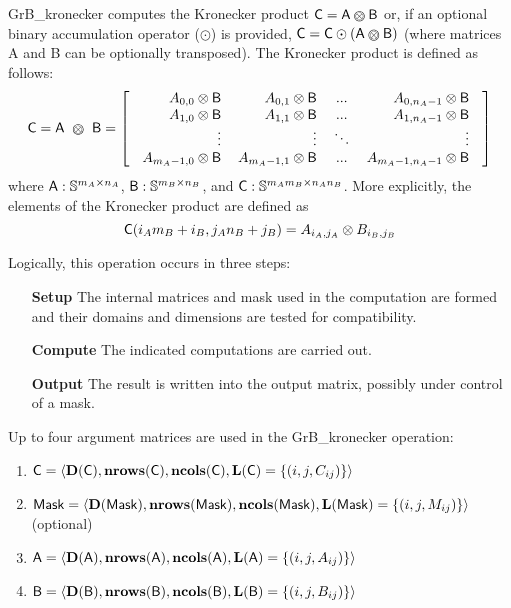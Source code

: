 {\sf GrB\_kronecker} computes the Kronecker product ${\sf C} = {\sf
A} \kron {\sf B}$ or, if an optional binary accumulation
operator ($\odot$) is provided, ${\sf C} = {\sf C} \odot
\left({\sf A} \kron {\sf B}\right)$ (where matrices {\sf A}
and {\sf B} can be optionally transposed).  The Kronecker product is defined as
follows: \\
\[
    {\sf C} = {\sf A} ~ \kron ~ {\sf B} = \left[
    \text{
    \begin{tabular}{rrcr}
        $A_{0,0} \otimes {\sf B}$ & $A_{0,1} \otimes {\sf B}$ & ... & $A_{0,n_A-1} \otimes {\sf B}$ \\
        $A_{1,0} \otimes {\sf B}$ & $A_{1,1} \otimes {\sf B}$ & ... & $A_{1,n_A-1} \otimes {\sf B}$ \\
        $\vdots$ & $\vdots$ & $\ddots$ & $\vdots$ \\
        $A_{m_A-1,0} \otimes {\sf B}$ & $A_{m_A-1,1} \otimes {\sf B}$ & ... & $A_{m_A-1,n_A-1} \otimes {\sf B}$ \\
    \end{tabular}
    }
    \right]
\]
where ${\sf A} : {\mathbb S}^{m_A \times n_A}$, ${\sf B} : {\mathbb S}^{m_B \times n_B}$, and
${\sf C} : {\mathbb S}^{m_A m_B \times n_A n_B}$.  More explicitly, the elements of
the Kronecker product are defined as
\[
    {\sf C}(i_A m_B + i_B, j_A n_B + j_B) = A_{i_A,j_A} \otimes B_{i_B,j_B}
\]

Logically, this operation
occurs in three steps:
\begin{enumerate}[leftmargin=0.85in]
\item[\bf Setup] The internal matrices and mask used in the computation are formed and their 
domains and dimensions are tested for compatibility.
\item[\bf Compute] The indicated computations are carried out.
\item[\bf Output] The result is written into the output matrix, possibly under control of a mask.
\end{enumerate}

Up to four argument matrices are used in the {\sf GrB\_kronecker} operation:
\begin{enumerate}
	\item ${\sf C} = \langle \bold{D}({\sf C}),\bold{nrows}({\sf C}),\bold{ncols}({\sf C}),\bold{L}({\sf C}) = \{(i,j,C_{ij}) \} \rangle$
	\item ${\sf Mask} = \langle \bold{D}({\sf Mask}),\bold{nrows}({\sf Mask}),\bold{ncols}({\sf Mask}),\bold{L}({\sf Mask}) = \{(i,j,M_{ij}) \} \rangle$ (optional)
	\item ${\sf A} = \langle \bold{D}({\sf A}),\bold{nrows}({\sf A}), \bold{ncols}({\sf A}),\bold{L}({\sf A}) = \{(i,j,A_{ij}) \} \rangle$
	\item ${\sf B} = \langle \bold{D}({\sf B}),\bold{nrows}({\sf B}), \bold{ncols}({\sf B}),\bold{L}({\sf B}) = \{(i,j,B_{ij}) \} \rangle$
\end{enumerate}

